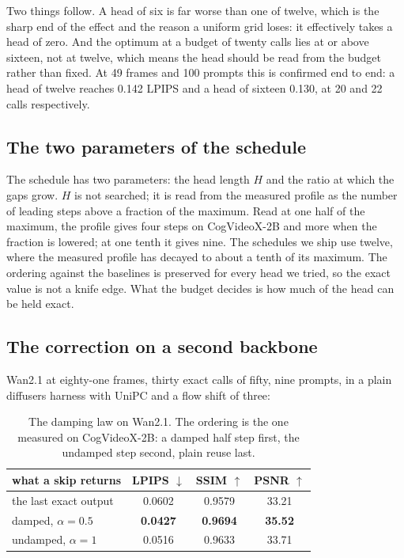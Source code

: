Two things follow. A head of six is far worse than one of twelve, which is the sharp end of the effect and the reason a uniform grid loses: it effectively takes a head of zero. And the optimum at a budget of twenty calls lies at or above sixteen, not at twelve, which means the head should be read from the budget rather than fixed. At 49 frames and 100 prompts this is confirmed end to end: a head of twelve reaches 0.142 LPIPS and a head of sixteen 0.130, at 20 and 22 calls respectively.

\subsection{The two parameters of the schedule}
\label{app:params}

The schedule has two parameters: the head length $H$ and the ratio at which the gaps grow. $H$ is not searched; it is read from the measured profile as the number of leading steps above a fraction of the maximum. Read at one half of the maximum, the profile gives four steps on CogVideoX-2B and more when the fraction is lowered; at one tenth it gives nine. The schedules we ship use twelve, where the measured profile has decayed to about a tenth of its maximum. The ordering against the baselines is preserved for every head we tried, so the exact value is not a knife edge. What the budget decides is how much of the head can be held exact.


\subsection{The correction on a second backbone}
\label{app:scope}

Wan2.1 at eighty-one frames, thirty exact calls of fifty, nine prompts, in a plain diffusers
harness with UniPC and a flow shift of three:

\begin{table}[h]
\centering\footnotesize\setlength{\tabcolsep}{4pt}
\begin{tabular}{lccc}
\toprule
what a skip returns & LPIPS $\downarrow$ & SSIM $\uparrow$ & PSNR $\uparrow$ \\
\midrule
the last exact output & 0.0602 & 0.9579 & 33.21 \\
damped, $\alpha=0.5$ & \textbf{0.0427} & \textbf{0.9694} & \textbf{35.52} \\
undamped, $\alpha=1$ & 0.0516 & 0.9633 & 33.71 \\
\bottomrule
\end{tabular}
\caption{The damping law on Wan2.1. The ordering is the one measured on CogVideoX-2B: a damped
half step first, the undamped step second, plain reuse last.}
\label{tab:wan_alpha}
\end{table}

